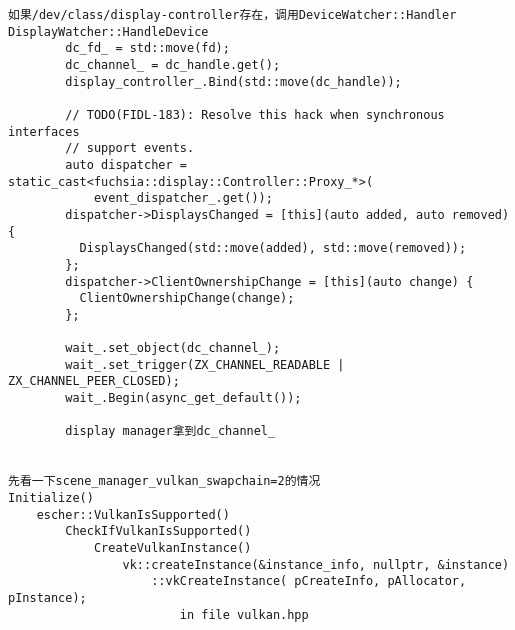 \begin{verbatim}
如果/dev/class/display-controller存在，调用DeviceWatcher::Handler
DisplayWatcher::HandleDevice
        dc_fd_ = std::move(fd);
        dc_channel_ = dc_handle.get();
        display_controller_.Bind(std::move(dc_handle));

        // TODO(FIDL-183): Resolve this hack when synchronous interfaces
        // support events.
        auto dispatcher = static_cast<fuchsia::display::Controller::Proxy_*>(
            event_dispatcher_.get());
        dispatcher->DisplaysChanged = [this](auto added, auto removed) {
          DisplaysChanged(std::move(added), std::move(removed));
        };
        dispatcher->ClientOwnershipChange = [this](auto change) {
          ClientOwnershipChange(change);
        };

        wait_.set_object(dc_channel_);
        wait_.set_trigger(ZX_CHANNEL_READABLE | ZX_CHANNEL_PEER_CLOSED);
        wait_.Begin(async_get_default());

        display manager拿到dc_channel_


先看一下scene_manager_vulkan_swapchain=2的情况
Initialize()
    escher::VulkanIsSupported()
        CheckIfVulkanIsSupported()
            CreateVulkanInstance()
                vk::createInstance(&instance_info, nullptr, &instance)
                    ::vkCreateInstance( pCreateInfo, pAllocator, pInstance);
                        in file vulkan.hpp
\end{verbatim}